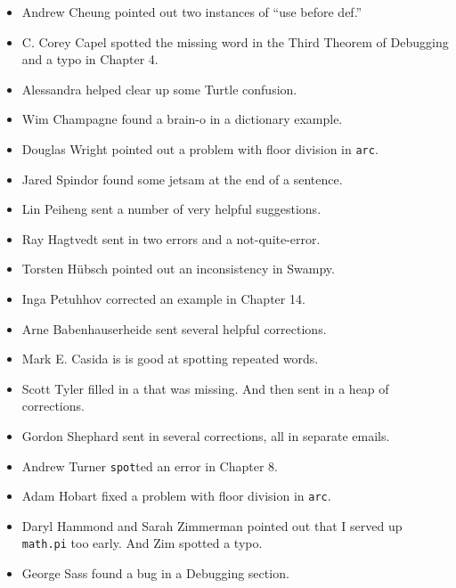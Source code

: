 \begin{itemize}
\item Andrew Cheung pointed out two instances of ``use before def.''

\item C. Corey Capel spotted the missing word in the Third Theorem
of Debugging and a typo in Chapter 4.

\item Alessandra helped clear up some Turtle confusion.

\item Wim Champagne found a brain-o in a dictionary example.

\item Douglas Wright pointed out a problem with floor division in
{\tt arc}.

\item Jared Spindor found some jetsam at the end of a sentence.

\item Lin Peiheng sent a number of very helpful suggestions.

\item Ray Hagtvedt sent in two errors and a not-quite-error.

\item Torsten H\"{u}bsch pointed out an inconsistency in Swampy.

\item Inga Petuhhov corrected an example in Chapter 14.

\item Arne Babenhauserheide sent several helpful corrections.

\item Mark E. Casida is is good at spotting repeated words.

\item Scott Tyler filled in a that was missing.  And then sent in
a heap of corrections.

\item Gordon Shephard sent in several corrections, all in separate
emails.

\item Andrew Turner {\tt spot}ted an error in Chapter 8.

\item Adam Hobart fixed a problem with floor division in {\tt arc}.

\item Daryl Hammond and Sarah Zimmerman pointed out that I served
up {\tt math.pi} too early.  And Zim spotted a typo.

\item George Sass found a bug in a Debugging section.


\end{itemize}

